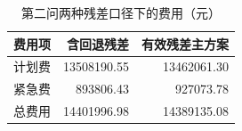 \begin{table}[htbp]\centering\small
\caption{第二问两种残差口径下的费用（元）}
\begin{tabular}{lrr}\toprule
费用项 & 含回退残差 & 有效残差主方案\\\midrule
计划费 & 13508190.55 & 13462061.30\\
紧急费 & 893806.43 & 927073.78\\
总费用 & 14401996.98 & 14389135.08\\
\bottomrule\end{tabular}\end{table}

